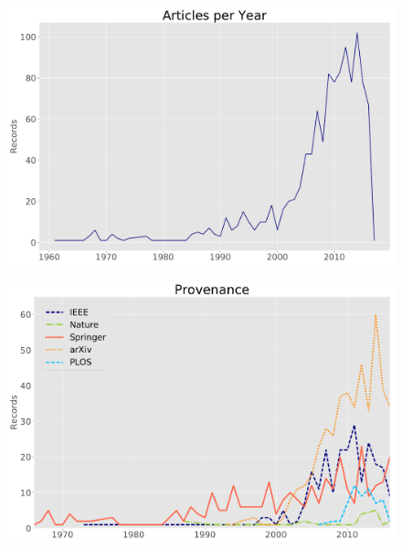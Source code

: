 \documentclass{beamer}
\begin{document}
\begin{frame}
\begin{center}
\begin{figure}[H]
    
\end{figure}
\end{center}
\end{frame}

\begin{frame}
\begin{center}
\begin{figure}[]
        \includegraphics[width=\textwidth]{static/articles-year.pdf}
\end{figure}
\end{center}
\end{frame}

\begin{frame}
\begin{center}
\begin{figure}[]
        \includegraphics[width=\textwidth]{static/ipd-provenance.pdf}
\end{figure}
\end{center}
\end{frame}
\end{document}
